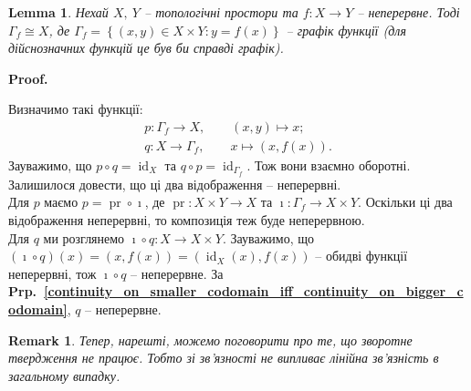 \documentclass[a4paper, 10pt]{article}
\makeatletter
\theoremstyle{theoremdd}
\newtheorem{remark}[theorem]{Remark}
\newtheorem{lemma}[theorem]{Lemma}
\newcommand\prpref[1]{\textbf{Prp.~\ref{#1}}}
\DeclareMathOperator{\id}{id}
\DeclareMathOperator{\pr}{pr}
\renewenvironment{proof}[1][Proof.\\]{\par
\pushQED{\hfill \qed}%
\normalfont \topsep6\p@\@plus6\p@\relax
\trivlist
\item\relax
{\bfseries
#1\@addpunct{.}}\hspace\labelsep\ignorespaces
}{%
\popQED\endtrivlist\@endpefalse
}
\makeatother
\begin{document}
\begin{lemma}
\label{graph_function_homeomorphism}
Нехай $X,\ Y$ -- топологічні простори та $f \colon X \to Y$ -- неперервне. Тоді $\Gamma_f \cong X$, де $\Gamma_f = \left\{ (x,y) \in X \times Y : y = f(x) \right\}$ -- графік функції (для дійснозначних функцій це був би справді графік).
\end{lemma}

\begin{proof}
Визначимо такі функції:
\begin{gather*}
p \colon \Gamma_f \to X, \qquad (x,y) \mapsto x; \\
q \colon X \to \Gamma_f, \qquad x \mapsto (x,f(x)).
\end{gather*}
Зауважимо, що $p \circ q = \id_X$ та $q \circ p = \id_{\Gamma_f}$. Тож вони взаємно оборотні. Залишилося довести, що ці два відображення -- неперервні.\\
Для $p$ маємо $p = \pr \circ \imath$, де $\pr \colon X \times Y \to X$ та $\imath \colon \Gamma_f \to X \times Y$. Оскільки ці два відображення неперервні, то композиція теж буде неперервною.\\
Для $q$ ми розглянемо $\imath \circ q \colon X \to X \times Y$. Зауважимо, що $(\imath \circ q)(x) = (x,f(x)) = (\id_X(x),f(x))$ -- обидві функції неперервні, тож $\imath \circ q$ -- неперервне. За \prpref{continuity_on_smaller_codomain_iff_continuity_on_bigger_codomain}, $q$ -- неперервне.
\end{proof}

\begin{remark}
Тепер, нарешті, можемо поговорити про те, що зворотне твердження не працює. Тобто зі зв'язності не випливає лінійна зв'язність в загальному випадку.
\end{remark}
\end{document}
